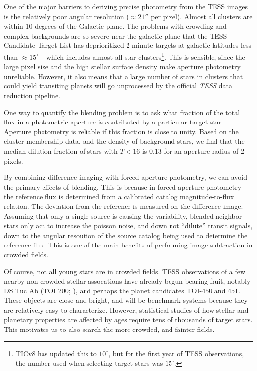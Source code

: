 \documentclass[12pt,twocolumn,tighten]{aastex62}
\begin{document}
One of the major barriers to deriving precise photometry from the TESS
images is the relatively poor angular resolution ($\approx 21''$ per
pixel).  Almost all clusters are within 10 degrees of the Galactic
plane. The problems with crowding and complex backgrounds are so
severe near the galactic plane that the TESS Candidate Target List has
deprioritized 2-minute targets at galactic latitudes less than
$\approx 15^\circ$~\citep{stassun_TIC_2018,stassun_TIC8_2019}, which
includes almost all star clusters\footnote{TICv8 has updated this to
$10^\circ$, but for the first year of TESS observations, the number
used when selecting target stars was $15^\circ$.}.  This is sensible,
since the large pixel size and the high stellar surface density
make aperture photometry unreliable.  
However, it also means that a
large number of stars in clusters that could yield transiting planets
will go unprocessed by the official {\it TESS} data reduction
pipeline.

One way to quantify the blending problem is to ask what fraction of
the total flux in a photometric aperture is contributed by a
particular target star. Aperture photometry is reliable if this
fraction is close to unity.  Based on the
\citet{Kharchenko_et_al_2013} cluster membership data, and the density
of background stars, we find that the median dilution fraction of
stars with $T< 16$ is 0.13 for an aperture radius of 2 pixels.

By combining difference imaging with forced-aperture photometry, we
can avoid the primary effects of blending.  This is because in
forced-aperture photometry the reference flux is determined from a
calibrated catalog magnitude-to-flux relation.  The deviation from the
reference is measured on the difference image.  Assuming that only a
single source is causing the variability, blended neighbor stars only
act to increase the poisson noise, and down not ``dilute'' transit
signals, down to the angular resoution of the source catalog being
used to determine the reference flux.  This is one of the main
benefits of performing image subtraction in crowded fields.

Of course, not all young stars are in crowded fields.  TESS
observations of a few nearby non-crowded stellar assocations have
already begun bearing fruit, notably DS Tuc Ab (TOI 200;
\citealt{benatti_dstuc_2019,newton_dstuc_2019}), and perhaps the
planet candidates TOI-450 and 451.  These objects are close and
bright, and will be benchmark systems because they are relatively easy
to characterize.  However, statistical studies of how stellar and
planetary properties are affected by ages require tens of thousands of
target stars.  This motivates us to also search the more crowded, and
fainter fields.
\end{document}
